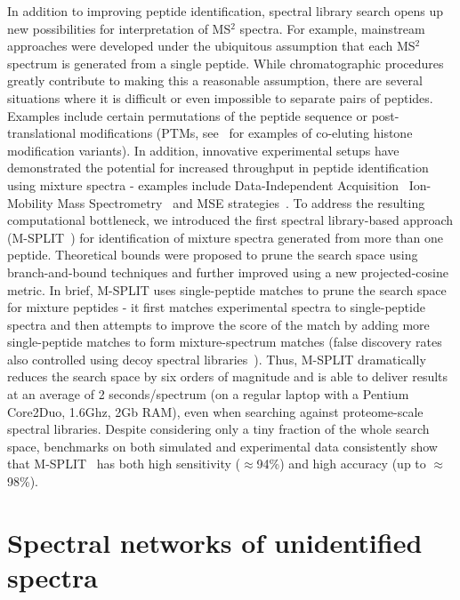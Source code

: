 \documentclass[8.5pt,twoside,twocolumn]{article}
\begin{document}
In addition to improving peptide identification, spectral library search opens up new possibilities for interpretation of MS$^2$ spectra. For example, mainstream approaches were developed under the ubiquitous assumption that each MS$^2$ spectrum is generated from a single peptide. While chromatographic procedures greatly contribute to making this a reasonable assumption, there are several situations where it is difficult or even impossible to separate pairs of peptides. Examples include certain permutations of the peptide sequence or post-translational modifications (PTMs, see~\cite{phanstiel08} for examples of co-eluting histone modification variants). In addition, innovative experimental setups have demonstrated the potential for increased throughput in peptide identification using mixture spectra - examples include Data-Independent Acquisition~\cite{venable04dia} Ion-Mobility Mass Spectrometry~\cite{masselon03} and MSE strategies~\cite{chakraborty07}. To address the resulting computational bottleneck, we introduced the first spectral library-based approach (M-SPLIT~\cite{wang10}) for identification of mixture spectra generated from more than one peptide. Theoretical bounds were proposed to prune the search space using branch-and-bound techniques and further improved using a new projected-cosine metric. In brief, M-SPLIT uses single-peptide matches to prune the search space for mixture peptides - it first matches experimental spectra to single-peptide spectra and then attempts to improve the score of the match by adding more single-peptide matches to form mixture-spectrum matches (false discovery rates also controlled using decoy spectral libraries~\cite{lam10}). Thus, M-SPLIT dramatically reduces the search space by six orders of magnitude and is able to deliver results at an average of 2 seconds/spectrum (on a regular laptop with a Pentium Core2Duo, 1.6Ghz, 2Gb RAM), even when searching against proteome-scale spectral libraries. Despite considering only a tiny fraction of the whole search space, benchmarks on both simulated and experimental data consistently show that M-SPLIT~\cite{wang10} has both high sensitivity ($\approx$94\%) and high accuracy (up to $\approx$98\%).

\section{Spectral networks of unidentified spectra}
\end{document}
